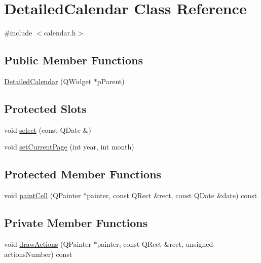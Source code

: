 \hypertarget{class_detailed_calendar}{\section{Detailed\-Calendar Class Reference}
\label{class_detailed_calendar}
}


{\ttfamily \#include $<$calendar.\-h$>$}

\subsection*{Public Member Functions}
\begin{DoxyCompactItemize}
\item 
\hyperlink{class_detailed_calendar_aa9f4a0f1c2ed25b210893081f579a5f8}{Detailed\-Calendar} (Q\-Widget $\ast$p\-Parent)
\end{DoxyCompactItemize}
\subsection*{Protected Slots}
\begin{DoxyCompactItemize}
\item 
void \hyperlink{class_detailed_calendar_a43d18804357496ac57b234c0c08dcf30}{select} (const Q\-Date \&)
\item 
void \hyperlink{class_detailed_calendar_a955c6477aca828d83ff80bc9d3af7ceb}{set\-Current\-Page} (int year, int month)
\end{DoxyCompactItemize}
\subsection*{Protected Member Functions}
\begin{DoxyCompactItemize}
\item 
void \hyperlink{class_detailed_calendar_a9dd0c5c754da4f0224c8251545a1ab57}{paint\-Cell} (Q\-Painter $\ast$painter, const Q\-Rect \&rect, const Q\-Date \&date) const 
\end{DoxyCompactItemize}
\subsection*{Private Member Functions}
\begin{DoxyCompactItemize}
\item 
void \hyperlink{class_detailed_calendar_a2be0dc0dc0025927c82d2f0d48526e5e}{draw\-Actions} (Q\-Painter $\ast$painter, const Q\-Rect \&rect, unsigned actions\-Number) const 
\end{DoxyCompactItemize}
